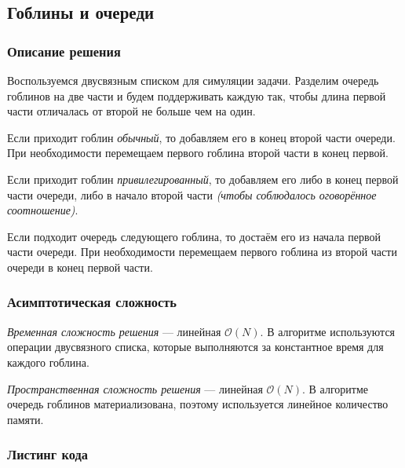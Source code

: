 \subsection{Гоблины и очереди}

\subsubsection{Описание решения}

Воспользуемся двусвязным списком для симуляции задачи. Разделим очередь гоблинов на две части и будем поддерживать каждую так, чтобы длина первой части отличалась от второй не больше чем на один.

Если приходит гоблин \textit{обычный}, то добавляем его в конец второй части очереди. При необходимости перемещаем первого гоблина второй части в конец первой.

Если приходит гоблин \textit{привилегированный}, то добавляем его либо в конец первой части очереди, либо в начало второй части \textit{(чтобы соблюдалось оговорённое соотношение)}.

Если подходит очередь следующего гоблина, то достаём его из начала первой части очереди. При необходимости перемещаем первого гоблина из второй части очереди в конец первой части.

\subsubsection{Асимптотическая сложность}

\textit{Временная сложность решения} --- линейная \( \mathcal{O}(N) \). В алгоритме используются операции двусвязного списка, которые выполняются за константное время для каждого гоблина.

\textit{Пространственная сложность решения} --- линейная \( \mathcal{O}(N) \). В алгоритме очередь гоблинов материализована, поэтому используется линейное количество памяти.

\subsubsection{Листинг кода}

